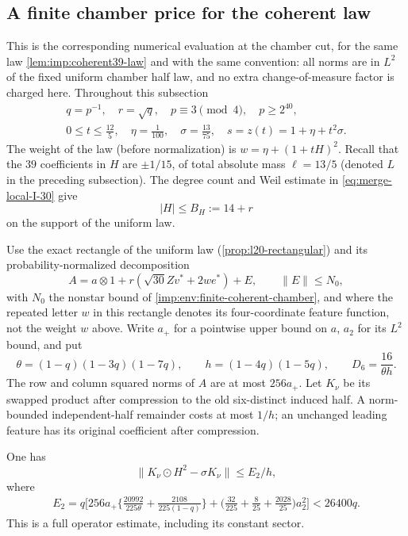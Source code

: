 \subsection{A finite chamber price for the coherent law}
\label{imp:env:finite-coherent-section}

This is the corresponding numerical evaluation at the chamber
cut, for the same law \cref{lem:imp:coherent39-law} and with the
same convention: all norms are in $L^2$ of the fixed uniform
chamber half law, and no extra change-of-measure factor is
charged here. Throughout this subsection
\begin{gather*}
 q=p^{-1},\quad r=\sqrt q,\quad p\equiv3\pmod4,
 \quad p\ge2^{40},\\
 0\le t\le\frac{12}{5},\quad\eta=\frac1{100},\quad
 \sigma=\frac{13}{75},\quad s=z(t)=1+\eta+t^2\sigma.
\end{gather*}
The weight of the law (before normalization) is
$w=\eta+(1+tH)^2$. Recall that the $39$ coefficients in $H$ are
$\pm1/15$, of total absolute mass $\ell=13/5$ (denoted $L$ in the preceding subsection). The degree count
and Weil estimate in \eqref{eq:merge-local-I-30} give
\begin{equation}
 |H|\le B_H:=14+r
 \label{imp:env:coherent-score-bound}
\end{equation}
on the support of the uniform law.

Use the exact rectangle of the uniform law
(\cref{prop:l20-rectangular}) and its probability-normalized
decomposition
\[
 A=a\otimes1+r(\sqrt{30}Zv^*+2we^*)+E,
 \qquad \|E\|\le N_0,
\]
with $N_0$ the nonstar bound of
\cref{imp:env:finite-coherent-chamber}, and where the repeated
letter $w$ in this rectangle denotes its
four-coordinate feature function, not the weight $w$ above.
Write $a_+$ for a pointwise upper bound on $a$, $a_2$ for its
$L^2$ bound, and put
\[
 \theta=(1-q)(1-3q)(1-7q),\qquad
 h=(1-4q)(1-5q),\qquad D_6=\frac{16}{\theta h}.
\]
The row and column squared norms of $A$ are at most $256a_+$.
Let $K_\nu$ be its swapped product after compression to the old
six-distinct induced half.  A norm-bounded independent-half remainder
costs at most $1/h$; an unchanged leading feature has its original
coefficient after compression.

\begin{lemma}
\label{imp:env:coherent-full-covariance}
One has
\[
 \|K_\nu\odot H^2-\sigma K_\nu\|\le E_2/h,
\]
where
\begin{align}
 E_2=q\biggl[256a_+\biggl\{
       \frac{20992}{225\theta}+\frac{2108}{225(1-q)}\biggr\}
   +\biggl(\frac{32}{225}+\frac8{25}+\frac{2028}{25}\biggr)a_2^2
      \biggr]<26400q.\label{imp:env:coherent-E2}
\end{align}
This is a full operator estimate, including its constant sector.
\end{lemma}

